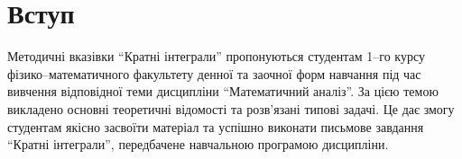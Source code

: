 \chapter*{Вступ}
Методичні вказівки ``Кратні інтеграли'' пропонуються студентам 1--го курсу фізико--математичного факультету денної та
заочної форм навчання під час вивчення відповідної теми дисципліни ``Математичний аналіз''. За цією темою викладено
основні теоретичні відомості та розв’язані типові задачі. Це дає змогу студентам якісно засвоїти матеріал та успішно
виконати письмове завдання ``Кратні інтеграли'', передбачене навчальною програмою дисципліни.
